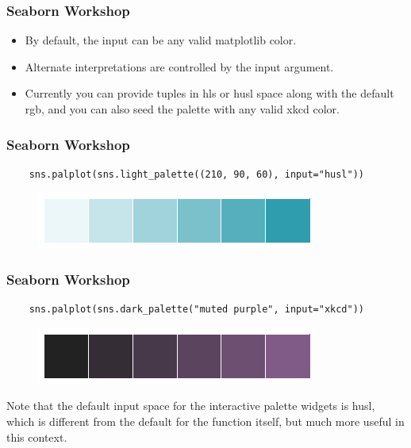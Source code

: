 \documentclass{beamer}
\begin{document}
\begin{frame}[fragile]
	\frametitle{Seaborn Workshop}
	\large
	\begin{itemize}
		\item
		By default, the input can be any valid matplotlib color. 
		\item Alternate interpretations are controlled by the input argument.
		\item  Currently you can provide tuples in hls or husl space along with the default rgb, and you can also seed the palette with any valid xkcd color.
	\end{itemize}
\end{frame}
\begin{frame}[fragile]
	\frametitle{Seaborn Workshop}
	\large
	\begin{verbatim}
	sns.palplot(sns.light_palette((210, 90, 60), input="husl"))
	\end{verbatim}
	\begin{figure}
		\centering
		\includegraphics[width=0.7\linewidth]{images/color_palettes_50_0}
		\caption{}
		\label{fig:color_palettes_50_0}
	\end{figure}
	
\end{frame}
\begin{frame}[fragile]
	\frametitle{Seaborn Workshop}
	\large
	\begin{verbatim}
	sns.palplot(sns.dark_palette("muted purple", input="xkcd"))
	\end{verbatim}
	\begin{figure}
		\centering
		\includegraphics[width=0.7\linewidth]{images/color_palettes_51_0}
	\end{figure}
	
	Note that the default input space for the interactive palette widgets is husl, which is different from the default for the function itself, but much more useful in this context.
\end{frame}
\end{document}
